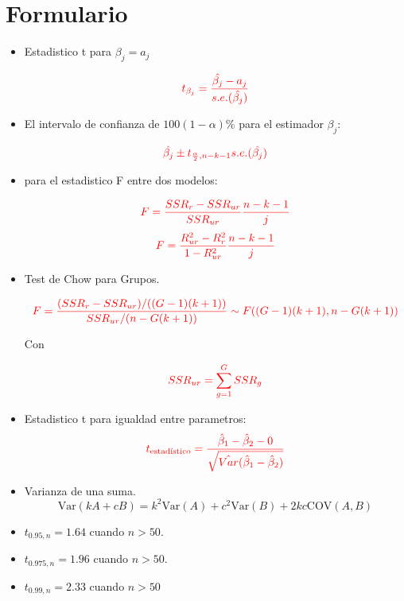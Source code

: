 \documentclass[10pt,a4paper]{article}
\begin{document}
 
\section*{Formulario}
\begin{itemize}

\item Estadistico t para $\beta_j = a_j$

$$\color{red}{t_{\beta_j}=\frac{\hat{\beta_j}-a_j}{s.e.(\hat{\beta_j})}}$$

\item El intervalo de confianza de $100(1-\alpha)\%$ para el estimador $\beta_j$:

$${\color{red}\hat{\beta_j} \pm t_{\frac{\alpha}{2},n-k-1}s.e.(\hat{\beta_j})}$$


\item para el estadistico F entre dos modelos:

$$\color{red}{F=\frac{SSR_r-SSR_{ur}}{SSR_{ur}}\frac{n-k-1}{j}}$$
$$\color{red}{F=\frac{R^2_{ur}-R^2_{r}}{1-R^2_{ur}}\frac{n-k-1}{j}}$$

\item Test de Chow para Grupos.

    \[\color{red}
    F = \frac{(SSR_r - SSR_{ur}) / ((G - 1)(k + 1))}{SSR_{ur} / (n - G(k + 1))} \sim F((G - 1)(k + 1), n - G(k + 1))
    \]

Con

$$\color{red}SSR_{ur} = \sum_{g=1}^G SSR_g$$

\item Estadistico t para igualdad entre parametros:
 \[\color{red}t_{\text{estadístico}} = \frac{\hat{\beta}_1 - \hat{\beta}_2 - 0}{\sqrt{\hat{Var}(\hat{\beta}_1 - \hat{\beta}_2)}}\]


\item  Varianza de una suma.
{\color{red}
$$\text{Var}(kA + cB) = k^2\text{Var}(A) + c^2\text{Var}(B) + 2kc\text{COV}(A, B)$$}

\item $t_{0.95,n} = 1.64$ cuando $n >50$.
\item $t_{0.975,n} = 1.96$ cuando $n >50$.
\item $t_{0.99,n}=2.33$ cuando $n>50$



\end{itemize}
\end{document}
